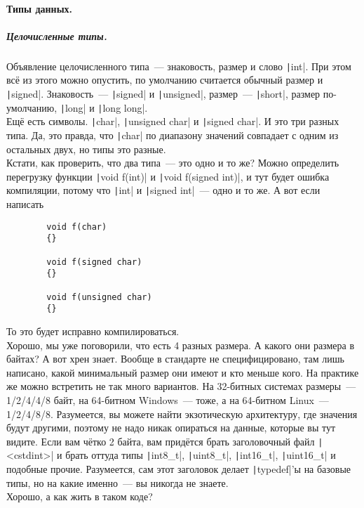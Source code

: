 \documentclass{article}
\begin{document}
    \paragraph{Типы данных.}
    \subparagraph{Целочисленные типы.}
    Объявление целочисленного типа~--- знаковость, размер и слово \texttt|int|. При этом всё из этого можно опустить, по умолчанию считается обычный размер и \texttt|signed|. Знаковость~--- \texttt|signed| и \texttt|unsigned|, размер~--- \texttt|short|, размер по-умолчанию, \texttt|long| и \texttt|long long|.\\
    Ещё есть символы. \texttt|char|, \texttt|unsigned char| и \texttt|signed char|. И это три разных типа. Да, это правда, что \texttt|char| по диапазону значений совпадает с одним из остальных двух, но типы это разные.\\
    Кстати, как проверить, что два типа~--- это одно и то же? Можно определить перегрузку функции \texttt|void f(int)| и \texttt|void f(signed int)|, и тут будет ошибка компиляции, потому что \texttt|int| и \texttt|signed int|~--- одно и то же. А вот если написать
    \begin{verbatim}
        void f(char)
        {}
        
        void f(signed char)
        {}
        
        void f(unsigned char)
        {}
    \end{verbatim}
    То это будет исправно компилироваться.\\
    Хорошо, мы уже поговорили, что есть 4 разных размера. А какого они размера в байтах? А вот хрен знает. Вообще в стандарте не специфицировано, там лишь написано, какой минимальный размер они имеют и кто меньше кого. На практике же можно встретить не так много вариантов. На 32-битных системах размеры~--- 1/2/4/4/8 байт, на 64-битном Windows~--- тоже, а на 64-битном Linux~--- 1/2/4/8/8. Разумеется, вы можете найти экзотическую архитектуру, где значения будут другими, поэтому не надо никак опираться на данные, которые вы тут видите. Если вам чётко 2 байта, вам придётся брать заголовочный файл \texttt|<cstdint>| и брать оттуда типы \texttt|int8_t|, \texttt|uint8_t|, \texttt|int16_t|, \texttt|uint16_t| и подобные прочие. Разумеется, сам этот заголовок делает \texttt|typedef|'ы на базовые типы, но на какие именно~--- вы никогда не знаете.\\
    Хорошо, а как жить в таком коде?
\end{document}
